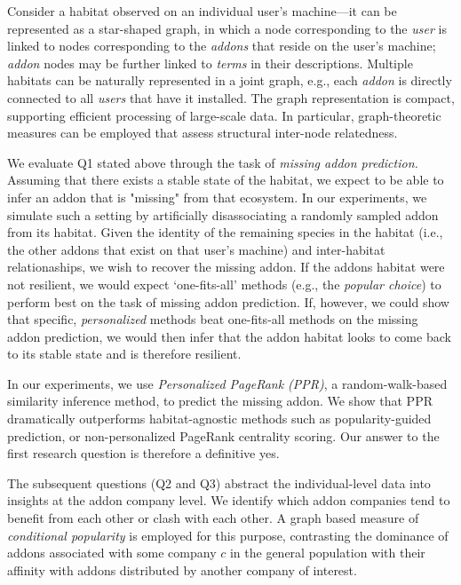 \documentclass[ijoc,nonblindrev]{informs3} %
\numberwithin{equation}{subsection}
\begin{document}
Consider a habitat observed on an individual user's machine---it can be represented as a star-shaped graph, in which a node corresponding to the \emph{user} is linked to nodes corresponding to the \emph{addons} that reside on the user's machine; {\it addon} nodes may be further linked to  {\it terms} in their descriptions. Multiple habitats can be naturally represented in a joint graph, e.g., each {\it addon} is directly connected to all {\it users} that have it installed. The graph representation is compact, supporting efficient processing of large-scale data. In particular, graph-theoretic measures can be employed that assess structural inter-node relatedness. 

We evaluate Q1 stated above through the task of {\it missing addon prediction.} Assuming that there exists a stable state of the habitat, we expect to be able to infer an addon that is "missing" from that ecosystem. In our experiments, we simulate such a setting by artificially disassociating a randomly sampled addon from its habitat. Given the identity of the remaining species in the habitat (i.e., the other addons that exist on that user's machine) and inter-habitat relationaships, we wish to recover the missing addon. If the addons habitat were not resilient, we would expect `one-fits-all' methods (e.g., the \emph{popular choice}) to perform best on the task of missing addon prediction. If, however, we could show that specific, \emph{personalized} methods beat one-fits-all methods on the missing addon prediction, we would then infer that the addon habitat looks to come back to its stable state and is therefore resilient. 

In our experiments, we use \emph{Personalized PageRank (PPR)}, a random-walk-based similarity inference method, to predict the missing addon. We show that PPR dramatically outperforms habitat-agnostic methods such as popularity-guided prediction, or non-personalized PageRank centrality scoring. Our answer to the first research question is therefore a definitive yes.

The subsequent questions (Q2 and Q3) abstract the individual-level data into insights at the addon company level. We identify which addon companies tend to benefit from each other or clash with each other. A graph based measure of {\it conditional popularity} is employed for this purpose, contrasting the dominance of addons associated with some company $c$ in the general population with their affinity with addons distributed by another company of interest.
\end{document}
